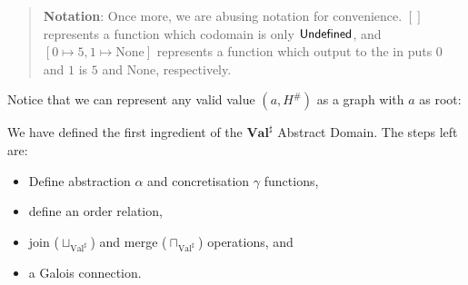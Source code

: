 %

\begin{quote}
  \textbf{Notation}: Once more, we are abusing notation for convenience. \([]\) represents
  a function which codomain is only \(\mathsf{Undefined}\), and
  \([0 \mapsto 5, 1 \mapsto \text{None}]\) represents a function which output to the in
  puts \(0\) and \(1\) is \(5\) and \(\text{None}\), respectively.
\end{quote}

Notice that we can represent any valid value \((a, H^\#)\) as a graph
with \(a\) as root:


%
%
%
%
%
%

We have defined the first ingredient of the \(\mathbf{Val}^\sharp\) Abstract Domain. The
steps left are:

\begin{itemize}
\tightlist
\item Define abstraction \(\alpha\) and concretisation \(\gamma\) functions,
\item define an order relation,
\item join (\(\sqcup_{\text{Val}^\sharp}\)) and merge (\(\sqcap_{\text{Val}^\sharp}\))
  operations, and
\item a Galois connection.
\end{itemize}

